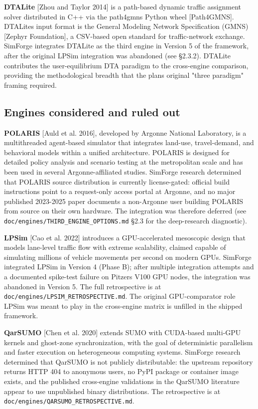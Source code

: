 \textbf{DTALite} {[}Zhou and Taylor 2014{]} is a path-based dynamic
traffic assignment solver distributed in C++ via the path4gmns Python
wheel {[}Path4GMNS{]}. DTALite\textquotesingle s input format is the
General Modeling Network Specification (GMNS) {[}Zephyr Foundation{]}, a
CSV-based open standard for traffic-network exchange. SimForge
integrates DTALite as the third engine in Version 5 of the framework,
after the original LPSim integration was abandoned (see §2.3.2). DTALite
contributes the user-equilibrium DTA paradigm to the cross-engine
comparison, providing the methodological breadth that the
plan\textquotesingle s original "three paradigm" framing required.

\subsection{Engines considered and ruled
out}\label{232-engines-considered-and-ruled-out}

\textbf{POLARIS} {[}Auld et al. 2016{]}, developed by Argonne National
Laboratory, is a multithreaded agent-based simulator that integrates
land-use, travel-demand, and behavioral models within a unified
architecture. POLARIS is designed for detailed policy analysis and
scenario testing at the metropolitan scale and has been used in several
Argonne-affiliated studies. SimForge research determined that POLARIS
source distribution is currently license-gated: official build
instructions point to a request-only access portal at Argonne, and no
major published 2023-2025 paper documents a non-Argonne user building
POLARIS from source on their own hardware. The integration was therefore
deferred (see \texttt{doc/engines/THIRD\_ENGINE\_OPTIONS.md} §2.3 for
the deep-research diagnostic).

\textbf{LPSim} {[}Cao et al. 2022{]} introduces a GPU-accelerated
mesoscopic design that models lane-level traffic flow with extreme
scalability, claimed capable of simulating millions of vehicle movements
per second on modern GPUs. SimForge integrated LPSim in Version 4 (Phase
B); after multiple integration attempts and a documented spike-test
failure on Pitzer\textquotesingle s V100 GPU nodes, the integration was
abandoned in Version 5. The full retrospective is at
\texttt{doc/engines/LPSIM\_RETROSPECTIVE.md}. The original
GPU-comparator role LPSim was meant to play in the cross-engine matrix
is unfilled in the shipped framework.

\textbf{QarSUMO} {[}Chen et al. 2020{]} extends SUMO with CUDA-based
multi-GPU kernels and ghost-zone synchronization, with the goal of
deterministic parallelism and faster execution on heterogeneous
computing systems. SimForge research determined that QarSUMO is not
publicly distributable: the upstream repository returns HTTP 404 to
anonymous users, no PyPI package or container image exists, and the
published cross-engine validations in the QarSUMO literature appear to
use unpublished binary distributions. The retrospective is at
\texttt{doc/engines/QARSUMO\_RETROSPECTIVE.md}.

